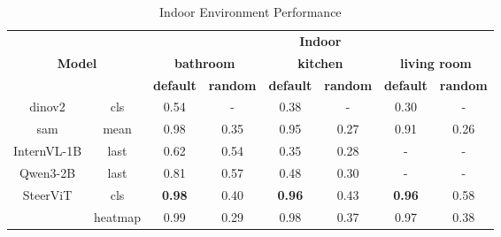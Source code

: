 \begin{table}[h]
\centering
{\small
\begin{tabular}{|c|c|c|c|c|c|c|c|}
\hline
\multicolumn{2}{|c|}{} & \multicolumn{6}{c|}{\textbf{Indoor}} \\ \cline{3-8} 
\multicolumn{2}{|c|}{\multirow{2}{*}{\textbf{Model}}} & \multicolumn{2}{c|}{\textbf{bathroom}} & \multicolumn{2}{c|}{\textbf{kitchen}} & \multicolumn{2}{c|}{\textbf{living room}} \\ \cline{3-8} 
\multicolumn{2}{|c|}{} & \textbf{default} & \textbf{random} & \textbf{default} & \textbf{random} & \textbf{default} & \textbf{random} \\ \hline

dinov2 & cls & 0.54 & - & 0.38 & - & 0.30 & - \\ \hline

sam & mean & 0.98 & 0.35 & 0.95 & 0.27 & 0.91 & 0.26 \\ \hline
InternVL-1B & last & 0.62 & 0.54 & 0.35 & 0.28 & - & - \\ \hline
Qwen3-2B & last & 0.81 & 0.57 & 0.48 & 0.30 & - & - \\ \hline

\multirow{2}{*}{SteerViT} & cls & \textbf{0.98} & 0.40 & \textbf{0.96} & 0.43 & \textbf{0.96} & 0.58 \\ \cline{2-8} 
 & heatmap & 0.99 & 0.29 & 0.98 & 0.37 & 0.97 & 0.38 \\ \hline
\end{tabular}
\caption{Indoor Environment Performance}
\label{tab:indoor}
\par}
\end{table}